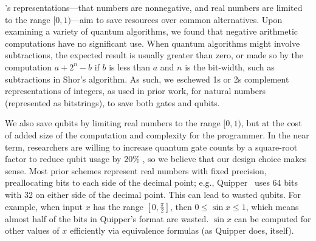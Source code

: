 \qvm's representations---that numbers are nonnegative, and real
numbers are limited to the range $[0,1)$---aim to save resources over
common alternatives.  Upon examining a variety of quantum algorithms,
we found that negative arithmetic computations have no significant
use. When quantum algorithms might involve subtractions, the expected
result is usually greater than zero, or made so by the computation
$a+2^n-b$ if $b$ is less than $a$ and $n$ is the bit-width, such as subtractions
in Shor's algorithm.  As such, we eschewed 1s or 2s complement
representations of integers, as used in prior work, for natural
numbers (represented as bitstrings), to save both gates and qubits.

We also save qubits by limiting real numbers to the range $[0,1)$, but
at the cost of added size of the computation and complexity for the
programmer. In the near term, researchers are willing to increase
quantum gate counts by a square-root factor to reduce qubit
usage by 20\% \cite{ccx-adder}, so we believe that our design choice makes
sense.
%
Most prior schemes represent real numbers with
fixed precision, preallocating bits to each side of the decimal point;
e.g., Quipper~\cite{10.1145/2491956.2462177} uses 64 bits with 32 on
either side of the decimal point. This can lead to wasted qubits. 
%
For example, when input $x$ has the range $[0,\frac{\pi}{2}]$, then
$0\le\sin{x}\le 1$, which means almost half of the bits in Quipper's
format are wasted. $\sin{x}$ can be computed for other values of $x$
efficiently via equivalence formulas (as Quipper does, itself).

